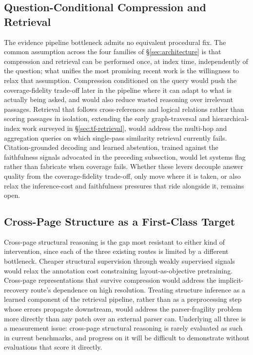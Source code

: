 \documentclass[11pt]{article}
\begin{document}
\subsection{Question-Conditional Compression and Retrieval}
The evidence pipeline bottleneck admits no equivalent procedural fix. The common assumption across the four families of \S\ref{sec:architecture} is that compression and retrieval can be performed once, at index time, independently of the question; what unifies the most promising recent work is the willingness to relax that assumption. Compression conditioned on the query would push the coverage-fidelity trade-off later in the pipeline where it can adapt to what is actually being asked, and would also reduce wasted reasoning over irrelevant passages. Retrieval that follows cross-references and logical relations rather than scoring passages in isolation, extending the early graph-traversal and hierarchical-index work surveyed in \S\ref{sec:tf-retrieval}, would address the multi-hop and aggregation queries on which single-pass similarity retrieval currently fails. Citation-grounded decoding and learned abstention, trained against the faithfulness signals advocated in the preceding subsection, would let systems flag rather than fabricate when coverage fails. Whether these levers decouple answer quality from the coverage-fidelity trade-off, only move where it is taken, or also relax the inference-cost and faithfulness pressures that ride alongside it, remains open.

\subsection{Cross-Page Structure as a First-Class Target}
Cross-page structural reasoning is the gap most resistant to either kind of intervention, since each of the three existing routes is limited by a different bottleneck. Cheaper structural supervision through weakly supervised signals would relax the annotation cost constraining layout-as-objective pretraining. Cross-page representations that survive compression would address the implicit-recovery route's dependence on high resolution. Treating structure inference as a learned component of the retrieval pipeline, rather than as a preprocessing step whose errors propagate downstream, would address the parser-fragility problem more directly than any patch over an external parser can. Underlying all three is a measurement issue: cross-page structural reasoning is rarely evaluated as such in current benchmarks, and progress on it will be difficult to demonstrate without evaluations that score it directly.
\end{document}
